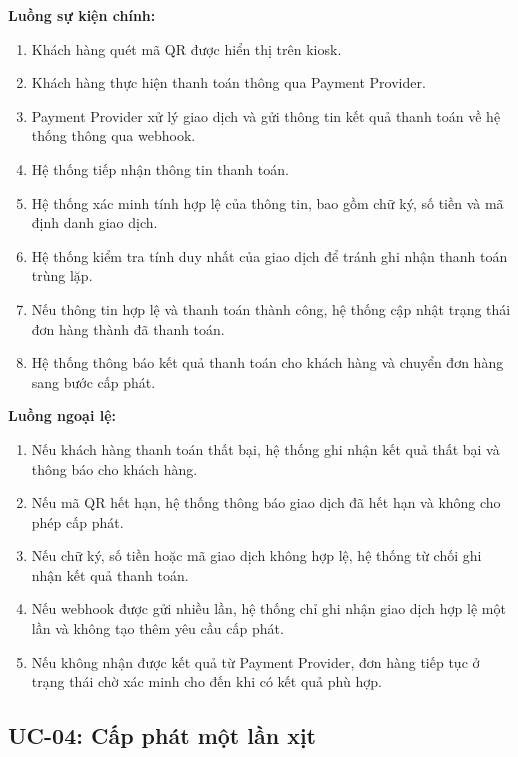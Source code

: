 \textbf{Luồng sự kiện chính:}
\begin{enumerate}
    \item Khách hàng quét mã QR được hiển thị trên kiosk.
    \item Khách hàng thực hiện thanh toán thông qua Payment Provider.
    \item Payment Provider xử lý giao dịch và gửi thông tin kết quả thanh toán về hệ thống thông qua webhook.
    \item Hệ thống tiếp nhận thông tin thanh toán.
    \item Hệ thống xác minh tính hợp lệ của thông tin, bao gồm chữ ký, số tiền và mã định danh giao dịch.
    \item Hệ thống kiểm tra tính duy nhất của giao dịch để tránh ghi nhận thanh toán trùng lặp.
    \item Nếu thông tin hợp lệ và thanh toán thành công, hệ thống cập nhật trạng thái đơn hàng thành đã thanh toán.
    \item Hệ thống thông báo kết quả thanh toán cho khách hàng và chuyển đơn hàng sang bước cấp phát.
\end{enumerate}

\textbf{Luồng ngoại lệ:}
\begin{enumerate}[label=\arabic{enumi}a*.]
    \item Nếu khách hàng thanh toán thất bại, hệ thống ghi nhận kết quả thất bại và thông báo cho khách hàng.
    \item Nếu mã QR hết hạn, hệ thống thông báo giao dịch đã hết hạn và không cho phép cấp phát.
    \item Nếu chữ ký, số tiền hoặc mã giao dịch không hợp lệ, hệ thống từ chối ghi nhận kết quả thanh toán.
    \item Nếu webhook được gửi nhiều lần, hệ thống chỉ ghi nhận giao dịch hợp lệ một lần và không tạo thêm yêu cầu cấp phát.
    \item Nếu không nhận được kết quả từ Payment Provider, đơn hàng tiếp tục ở trạng thái chờ xác minh cho đến khi có kết quả phù hợp.
\end{enumerate}

\subsection{UC-04: Cấp phát một lần xịt}


